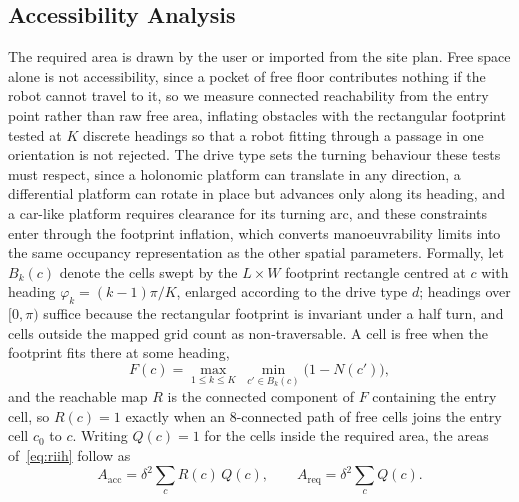 \documentclass[a4paper, 10pt, conference]{ieeeconf}
\begin{document}
\subsection{Accessibility Analysis}
\label{sec:rii}
The required area is drawn by the user or imported from the site plan.
Free space alone is not accessibility, since a pocket of free floor contributes nothing if the robot cannot travel to it, so we measure connected reachability from the entry point rather than raw free area, inflating obstacles with the rectangular footprint tested at $K$ discrete headings so that a robot fitting through a passage in one orientation is not rejected. The drive type sets the turning behaviour these tests must respect, since a holonomic platform can translate in any direction, a differential platform can rotate in place but advances only along its heading, and a car-like platform requires clearance for its turning arc, and these constraints enter through the footprint inflation, which converts manoeuvrability limits into the same occupancy representation as the other spatial parameters. Formally, let $B_{k}(c)$ denote the cells swept by the $L \times W$ footprint rectangle centred at $c$ with heading $\varphi_{k} = (k-1)\pi/K$, enlarged according to the drive type $d$; headings over $[0, \pi)$ suffice because the rectangular footprint is invariant under a half turn, and cells outside the mapped grid count as non-traversable.
A cell is free when the footprint fits there at some heading,
\begin{equation}
F(c) = \max_{1 \le k \le K}\; \min_{c' \in B_{k}(c)} \bigl(1 - N(c')\bigr),
\label{eq:inflate}
\end{equation}
and the reachable map $R$ is the connected component of $F$ containing the entry cell, so $R(c)=1$ exactly when an 8-connected path of free cells joins the entry cell $c_{0}$ to $c$. Writing $Q(c)=1$ for the cells inside the required area, the areas of~\eqref{eq:riih} follow as
\begin{equation}
A_{\mathrm{acc}} = \delta^{2} \sum_{c} R(c)\,Q(c), \qquad
A_{\mathrm{req}} = \delta^{2} \sum_{c} Q(c).
\label{eq:areas}
\end{equation}
\end{document}
